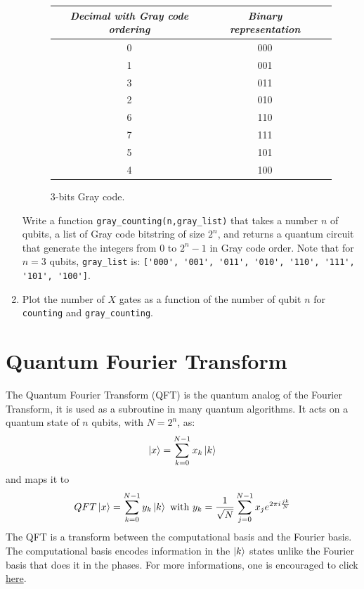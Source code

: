 \documentclass{article}
\begin{document}
\begin{enumerate}
\begin{figure}[H]
    \begin{tabular}{|c|c|c|}
    \hline
    \textit{Decimal with Gray code ordering} & \textit{Binary representation} \\
    \hline
    0 & 000 \\
    \hline
    1 & 001 \\
    \hline
    3 & 011 \\
    \hline
    2 & 010 \\
    \hline
    6 & 110 \\
    \hline
    7 & 111 \\
    \hline
    5 & 101 \\
    \hline
    4 & 100 \\
    \hline
    \end{tabular}
    \caption{3-bits Gray code.}
    \label{fig:gray}
    \end{figure}
    Write a function \verb|gray_counting(n,gray_list)| that takes a number $n$ of qubits, a list of Gray code bitstring of size $2^n$, and returns a quantum circuit that generate the integers from $0$ to $2^n-1$ in Gray code order. Note that for $n=3$ qubits, \verb|gray_list| is: \verb|['000', '001', '011', '010', '110', '111', '101', '100']|.
    \item Plot the number of $X$ gates as a function of the number of qubit $n$ for \verb|counting| and \verb|gray_counting|.
    \end{enumerate}
    
\section{Quantum Fourier Transform}

The Quantum Fourier Transform (QFT) is the quantum analog of the Fourier Transform, it is used as a subroutine in many quantum algorithms. It acts on a quantum state of $n$ qubits, with $N=2^n$, as:
\begin{equation*}
    \ket{x} = \sum_{k=0}^{N-1}x_k\ket{k}
\end{equation*}
and maps it to
\begin{equation*}
    QFT\ket{x} = \sum_{k=0}^{N-1}y_k\ket{k} \mbox{ with } y_k = \frac{1}{\sqrt{N}}\sum_{j=0}^{N-1}x_je^{2\pi i\frac{jk}{N}}
\end{equation*}
The QFT is a transform between the computational basis and the Fourier basis. The computational basis encodes information in the $\ket{k}$ states unlike the Fourier basis that does it in the phases. For more informations, one is encouraged to click \href{https://learn.qiskit.org/course/ch-algorithms/quantum-fourier-transform}{here}.
\end{document}
